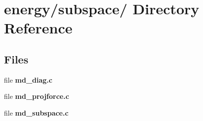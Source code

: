\section{energy/subspace/ Directory Reference}
\label{dir_aff14c3ba0a732dc9ddbeb7896d174bc}
\subsection*{Files}
\begin{CompactItemize}
\item 
file {\bf md\_\-diag.c}
\item 
file {\bf md\_\-projforce.c}
\item 
file {\bf md\_\-subspace.c}
\end{CompactItemize}
